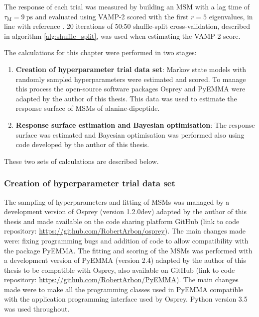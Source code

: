 The response of each trial was measured by building an MSM with a lag time of $\tau_{\mathrm{M}} = \SI{9}{\pico\second}$ and evaluated using VAMP-2 scored with the first $r=5$ eigenvalues, in line with reference \cite{bowmanQuantitativeComparisonAlternative2013}. \num{20} iterations of 50:50 shuffle-split cross-validation, described in algorithm \ref{alg:shuffle_split}, was used when estimating the VAMP-2 score. 

The calculations for this chapter were performed in two stages: 
\begin{enumerate}
    \item \textbf{Creation of hyperparameter trial data set}: Markov state models with randomly sampled hyperparameters were estimated and scored. To manage this process the open-source software packages Osprey \cite{mcgibbonOspreyHyperparameterOptimization2016} and PyEMMA \cite{schererPyEMMASoftwarePackage2015a} were adapted by the author of this thesis.  This data was used to estimate the response surface of MSMs of alanine-dipeptide. 
    \item \textbf{Response surface estimation and Bayesian optimisation}: The response surface was estimated and Bayesian optimisation was performed also using code developed by the author of this thesis. 
\end{enumerate}
These two sets of calculations are described below. 

\subsubsection*{Creation of hyperparameter trial data set} 
The sampling of hyperparameters and fitting of MSMs was managed by a development version of Osprey (version 1.2.0dev) \cite{mcgibbonOspreyHyperparameterOptimization2016} adapted by the author of this thesis and made available on the code sharing platform GitHub (link to code repository: \href{https://github.com/RobertArbon/osprey/tree/1a108009e560b6d5e989bb2bd1555ec62e6795d0}{\color{blue}https://github.com/RobertArbon/osprey}). The main changes made were: fixing programming bugs and addition of code to allow compatibility with the package PyEMMA.  The fitting and scoring of the MSMs was performed with a development version of PyEMMA (version 2.4) \cite{schererPyEMMASoftwarePackage2015a} adapted by the author of this thesis to be compatible with Osprey, also available on GitHub (link to code repository: \href{https://github.com/RobertArbon/PyEMMA/tree/39bcb0f7b43f4424072e3e67fdff1b12cb62c99d}{\color{blue}https://github.com/RobertArbon/PyEMMA}). The main changes made were to make all the programming classes used in PyEMMA compatible with the application programming interface used by Osprey. Python version 3.5 was used throughout. 

